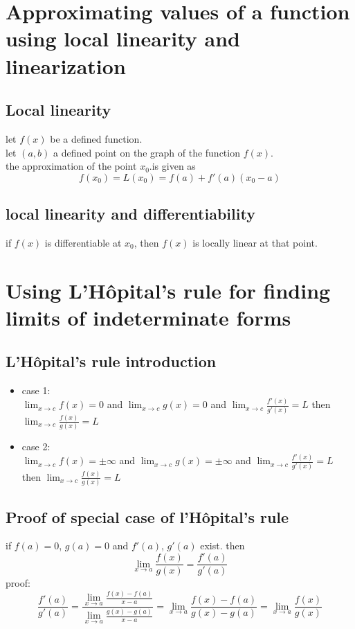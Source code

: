 \documentclass{article}
\begin{document}
\section{Approximating values of a function using local linearity and linearization}
    \subsection{Local linearity}
        let \(f(x)\)  be a  defined function. \\
        let \((a, b)\) a defined point on the graph of the function \(f(x)\). \\ 
        the approximation of the point \(x_0\).is given as 
            \[f(x_0) = L(x_0) = f(a) + f'(a)(x_0 - a)\]
    \subsection{local linearity and differentiability}
        if \(f(x)\) is differentiable at \(x_0\), then \(f(x)\) is locally linear at that point.
\section{ Using L’Hôpital’s rule for finding limits of indeterminate forms
}
    \subsection{L’Hôpital's rule introduction} 
        \begin{itemize}
            \item case 1: \\ \(\lim_{x \to c} f(x) = 0 \) and \(\lim_{x \to c} g(x) = 0\) and \(\lim_{x \to c}\frac{f'(x)}{g'(x)} = L\) then \(\lim_{x \to c} \frac{f(x)}{g(x)} = L\)

            \item case 2: \\ \(\lim_{x \to c} f(x) = \pm \infty \) and \(\lim_{x \to c} g(x) = \pm \infty\) and \(\lim_{x \to c}\frac{f'(x)}{g'(x)} = L\) then \(\lim_{x \to c} \frac{f(x)}{g(x)} = L\)
                
        \end{itemize}
    \subsection{Proof of special case of l'Hôpital's rule}
        if \(f(a) = 0 \), \(g(a) = 0\) and \(f'(a)\), \(g'(a)\) exist. 
        then \\  \[\lim_{x \to a} \frac{f(x)}{g(x)} = \frac{f'(a)}{g'(a)}\] 
        proof: 
            \[\frac{f'(a)}{g'(a)} = \frac{\lim_{x \to a} \frac{f(x) - f(a)}{x -a}}{\lim_{x \to a} \frac{g(x) - g(a)}{x -a}} = \lim_{x \to a} \frac{f(x) - f(a)}{g(x) - g(a)} = \lim_{x \to a} \frac{f(x)}{g(x)}\]
\end{document}
